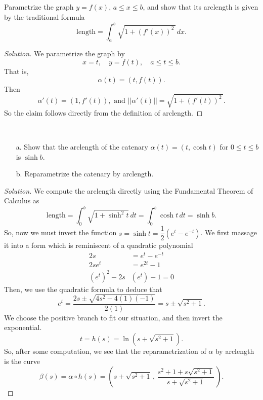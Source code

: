 \documentclass[Shifrin_Solutions_Spring_2015]{subfiles}
\begin{document}



\begin{exercise}
Parametrize the graph $y=f(x)$, $a\leq x \leq b$, and show that its arclength is given by the traditional formula
\[
\mbox{length} = \int_a^b \sqrt{1+(f'(x))^2\,}\, dx .
\]
\end{exercise}

\begin{proof}[Solution]
We parametrize the graph by
\[
x = t, \quad y = f(t), \quad a \leq t \leq b .
\]
That is,
\[
\alpha(t) = \left( t, f(t) \right).
\]
Then
\[
\alpha'(t) = \left( 1, f'(t) \right), \mbox{ and } ||\alpha'(t)|| = \sqrt{1 + (f'(t))^2\,} .
\]
So the claim follows directly from the definition of arclength.
\end{proof}




\begin{exercise}{$\ $}
\begin{itemize}
\item[a.] Show that the arclength of the catenary $\alpha(t) = (t, \cosh t)$ for $0\leq t\leq b$ is $\sinh b$.

\item[b.] Reparametrize the catenary by arclength.
\end{itemize}
\end{exercise}

\begin{proof}[Solution]
We compute the arclength directly using the Fundamental Theorem of Calculus as
\[
\text{length} = \int_0^b \sqrt{1 + \sinh^2 t } \, dt = \int_0^b \cosh t \, dt = \sinh b .
\]
So, now we must invert the function $s = \sinh t = \dfrac{1}{2} \left( e^t - e^{-t}\right)$. We first massage it into a form which is reminiscent of a quadratic polynomial
\begin{align*}
2s & = e^t - e^{-t} \\
2se^t &= e^{2t} - 1 \\
(e^t)^2  - 2 s& (e^t) - 1 = 0
\end{align*}
Then, we use the quadratic formula to deduce that
\[
e^t  = \dfrac{2s \pm \sqrt{4s^2 - 4(1)(-1)} }{2(1)} = s \pm \sqrt{s^2+1} .
\]
We choose the positive branch to fit our situation, and then invert the exponential.
\[ t = h(s) = \ln(  s + \sqrt{s^2+1} ) . \]
So, after some computation, we see that the reparametrization of $\alpha$ by arclength is the curve
\[
\beta(s) = \alpha\circ h(s) = \left(  s + \sqrt{s^2+1}\, , \,
\dfrac{s^2+1 + s\sqrt{s^2+1 } }{ s + \sqrt{s^2+1 } }\, \right).
\]
\end{proof}
\end{document}
